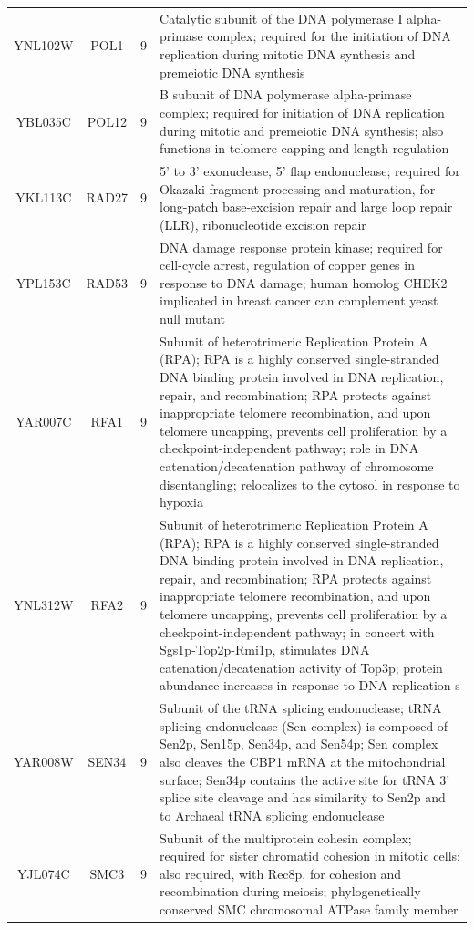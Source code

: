 \documentclass[]{article}
\begin{document}
\begin{longtable}{@{\extracolsep{3pt}} cccp{85mm}}
YNL102W & POL1 & 9 & Catalytic subunit of the DNA polymerase I alpha-primase complex; required for the initiation of DNA replication during mitotic DNA synthesis and premeiotic DNA synthesis \\ 
YBL035C & POL12 & 9 & B subunit of DNA polymerase alpha-primase complex; required for initiation of DNA replication during mitotic and premeiotic DNA synthesis; also functions in telomere capping and length regulation \\ 
YKL113C & RAD27 & 9 & 5' to 3' exonuclease, 5' flap endonuclease; required for Okazaki fragment processing and maturation, for long-patch base-excision repair and large loop repair (LLR), ribonucleotide excision repair \\ 
YPL153C & RAD53 & 9 & DNA damage response protein kinase; required for cell-cycle arrest, regulation of copper genes in response to DNA damage; human homolog CHEK2 implicated in breast cancer can complement yeast null mutant \\ 
YAR007C & RFA1 & 9 & Subunit of heterotrimeric Replication Protein A (RPA); RPA is a highly conserved single-stranded DNA binding protein involved in DNA replication, repair, and recombination; RPA protects against inappropriate telomere recombination, and upon telomere uncapping, prevents cell proliferation by a checkpoint-independent pathway; role in DNA catenation/decatenation pathway of chromosome disentangling; relocalizes to the cytosol in response to hypoxia \\ 
YNL312W & RFA2 & 9 & Subunit of heterotrimeric Replication Protein A (RPA); RPA is a highly conserved single-stranded DNA binding protein involved in DNA replication, repair, and recombination; RPA protects against inappropriate telomere recombination, and upon telomere uncapping, prevents cell proliferation by a checkpoint-independent pathway; in concert with Sgs1p-Top2p-Rmi1p, stimulates DNA catenation/decatenation activity of Top3p; protein abundance increases in response to DNA replication s \\ 
YAR008W & SEN34 & 9 & Subunit of the tRNA splicing endonuclease; tRNA splicing endonuclease (Sen complex) is composed of Sen2p, Sen15p, Sen34p, and Sen54p; Sen complex also cleaves the CBP1 mRNA at the mitochondrial surface; Sen34p contains the active site for tRNA 3' splice site cleavage and has similarity to Sen2p and to Archaeal tRNA splicing endonuclease \\ 
YJL074C & SMC3 & 9 & Subunit of the multiprotein cohesin complex; required for sister chromatid cohesion in mitotic cells; also required, with Rec8p, for cohesion and recombination during meiosis; phylogenetically conserved SMC chromosomal ATPase family member \\ 

\end{longtable}
\end{document}
